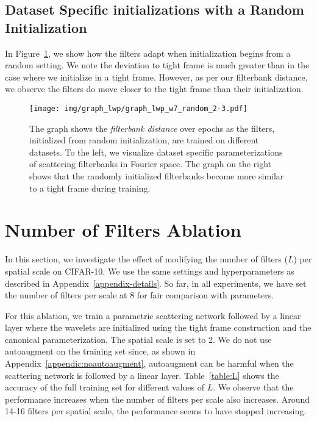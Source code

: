 \documentclass[10pt,twocolumn,letterpaper]{article}
\begin{document}
\subsection{Dataset Specific initializations with a Random Initialization}\label{appendix:random-init}
In Figure~\ref{fig:graphlwp_random}, we show how the filters adapt when initialization begins from a random setting. We note the deviation to tight frame is much greater than in the case where we initialize in a tight frame. However, as per our filterbank distance, we observe the filters do move closer to the tight frame than their initialization.
\begin{figure}[H]
    \centering
\texttt{[image: img/graph\_lwp/graph\_lwp\_w7\_random\_2-3.pdf]}
    \vspace{-7pt}
    \caption{The graph shows the \textit{filterbank distance} over epochs as the filters, initialized from random initialization, are trained on different datasets. To the left, we visualize dataset specific parameterizations of scattering filterbanks in Fourier space. The graph on the right shows that the randomly initialized filterbanks become more similar to a tight frame during training.}
    \label{fig:graphlwp_random}
\end{figure}

\section{Number of Filters Ablation}
\label{appendix:num_filter}
In this section, we investigate the effect of modifying the number of filters ($L$) per spatial scale on CIFAR-10. We use the same settings and hyperparameters as described in Appendix~\ref{appendix-details}. So far, in all experiments, we have set the number of filters per scale at 8 for fair comparison with parameters.

For this ablation, we train a parametric scattering network followed by a linear layer where the wavelets are initialized using the tight frame construction and the canonical parameterization. The spatial scale is set to 2. We do not use autoaugment on the training set since, as shown in Appendix~\ref{appendic:noautoaugment}, autoaugment can be harmful when the scattering network is followed by a linear layer. Table~\ref{table:L} shows the accuracy of the full training set for different values of $L$. We observe that the performance increases when the number of filters per scale also increases. Around 14-16 filters per spatial scale, the performance seems to have stopped increasing. 
\end{document}
